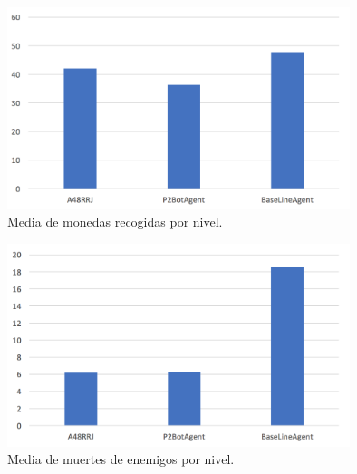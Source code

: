 \documentclass[10pt, spanish, pdftex]{../.template/template}
\begin{document}
    \begin{figure}[h!]
        \center
        \includegraphics[width=100mm]{monedas}
        \caption{ Media de monedas recogidas por nivel.} %
        \label{monedas}
    \end{figure}
    
    
    \begin{figure}[h!]
        \center
        \includegraphics[width=100mm]{muertes}
        \caption{ Media de muertes de enemigos por nivel.} %
        \label{muertes}
    \end{figure}
   
\end{document}
